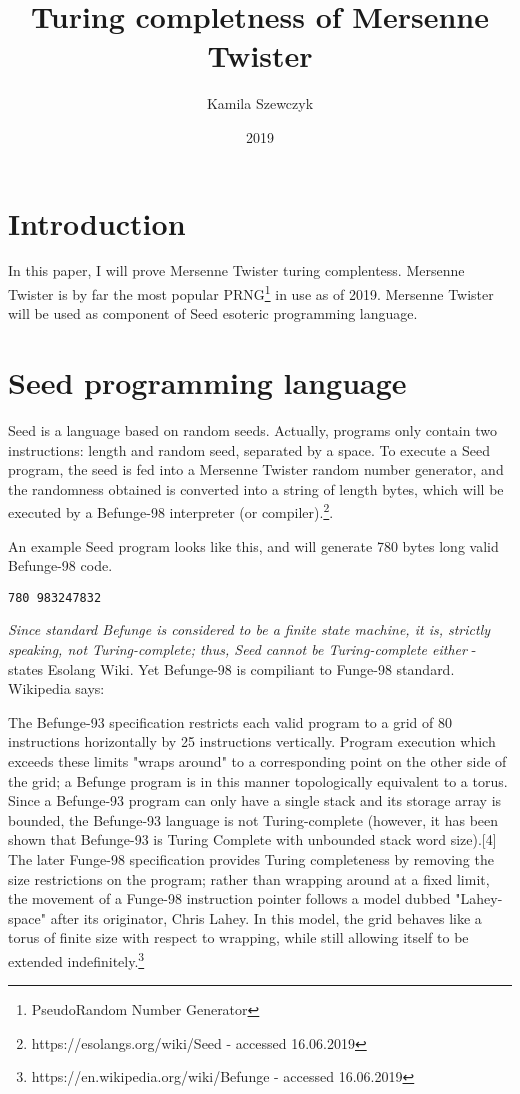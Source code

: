 \documentclass{article}
\title{Turing completness of Mersenne Twister}
\date{2019}
\author{Kamila Szewczyk}
\begin{document}
\maketitle

\section{Introduction}
\par In this paper, I will prove Mersenne Twister turing complentess. Mersenne Twister is by far the most popular PRNG\footnote{PseudoRandom Number Generator} in use as of 2019. Mersenne Twister will be used as component of Seed esoteric programming language.

\section{Seed programming language}
\par Seed is a language based on random seeds. Actually, programs only contain two instructions: length and random seed, separated by a space. To execute a Seed program, the seed is fed into a Mersenne Twister random number generator, and the randomness obtained is converted into a string of length bytes, which will be executed by a Befunge-98 interpreter (or compiler).\footnote{https://esolangs.org/wiki/Seed - accessed 16.06.2019}.

\par An example Seed program looks like this, and will generate 780 bytes long valid Befunge-98 code.

\begin{verbatim}
780 983247832
\end{verbatim}

\par \textit{Since standard Befunge is considered to be a finite state machine, it is, strictly speaking, not Turing-complete; thus, Seed cannot be Turing-complete either} - states Esolang Wiki. Yet Befunge-98 is compiliant to Funge-98 standard. Wikipedia says: 

\par The Befunge-93 specification restricts each valid program to a grid of 80 instructions horizontally by 25 instructions vertically. Program execution which exceeds these limits "wraps around" to a corresponding point on the other side of the grid; a Befunge program is in this manner topologically equivalent to a torus. Since a Befunge-93 program can only have a single stack and its storage array is bounded, the Befunge-93 language is not Turing-complete (however, it has been shown that Befunge-93 is Turing Complete with unbounded stack word size).[4] The later Funge-98 specification provides Turing completeness by removing the size restrictions on the program; rather than wrapping around at a fixed limit, the movement of a Funge-98 instruction pointer follows a model dubbed "Lahey-space" after its originator, Chris Lahey. In this model, the grid behaves like a torus of finite size with respect to wrapping, while still allowing itself to be extended indefinitely.\footnote{https://en.wikipedia.org/wiki/Befunge - accessed 16.06.2019}
\end{document}
